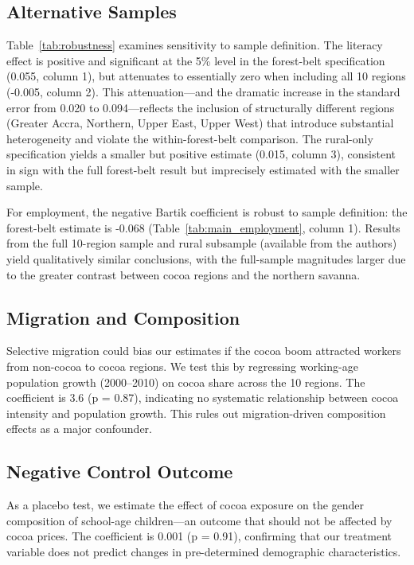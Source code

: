 \documentclass[12pt]{article}
\begin{document}
\subsection{Alternative Samples}



Table~\ref{tab:robustness} examines sensitivity to sample definition. The literacy effect is positive and significant at the 5\% level in the forest-belt specification (0.055, column 1), but attenuates to essentially zero when including all 10 regions (-0.005, column 2). This attenuation---and the dramatic increase in the standard error from 0.020 to 0.094---reflects the inclusion of structurally different regions (Greater Accra, Northern, Upper East, Upper West) that introduce substantial heterogeneity and violate the within-forest-belt comparison. The rural-only specification yields a smaller but positive estimate (0.015, column 3), consistent in sign with the full forest-belt result but imprecisely estimated with the smaller sample.

For employment, the negative Bartik coefficient is robust to sample definition: the forest-belt estimate is -0.068 (Table~\ref{tab:main_employment}, column 1). Results from the full 10-region sample and rural subsample (available from the authors) yield qualitatively similar conclusions, with the full-sample magnitudes larger due to the greater contrast between cocoa regions and the northern savanna.

\subsection{Migration and Composition}

Selective migration could bias our estimates if the cocoa boom attracted workers from non-cocoa to cocoa regions. We test this by regressing working-age population growth (2000--2010) on cocoa share across the 10 regions. The coefficient is 3.6 (p = 0.87), indicating no systematic relationship between cocoa intensity and population growth. This rules out migration-driven composition effects as a major confounder.

\subsection{Negative Control Outcome}

As a placebo test, we estimate the effect of cocoa exposure on the gender composition of school-age children---an outcome that should not be affected by cocoa prices. The coefficient is 0.001 (p = 0.91), confirming that our treatment variable does not predict changes in pre-determined demographic characteristics.
\end{document}
